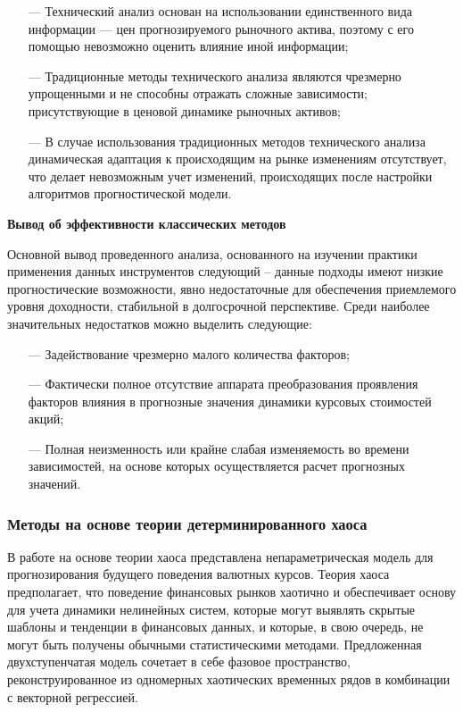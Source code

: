 \begin{itemize}[leftmargin=1.6\parindent]
    \item[---] Технический анализ основан на использовании единственного
вида информации –-- цен прогнозируемого рыночного актива, поэтому с
его помощью невозможно оценить влияние иной информации;
	\item[---] Традиционные методы технического анализа являются чрезмерно упрощенными и не способны отражать сложные зависимости;
присутствующие в ценовой динамике рыночных активов;
    \item[---] В случае использования традиционных методов технического
анализа динамическая адаптация к происходящим на рынке изменениям отсутствует, что делает невозможным учет изменений, происходящих после настройки алгоритмов прогностической модели.
\end{itemize}

\textbf{Вывод об эффективности классических методов}

\par Основной вывод проведенного анализа, основанного на изучении
практики применения данных инструментов следующий – данные подходы имеют низкие прогностические возможности, явно недостаточные для обеспечения приемлемого уровня доходности, стабильной в
долгосрочной перспективе. Среди наиболее значительных недостатков можно выделить следующие:

\begin{itemize}[leftmargin=1.6\parindent]
	\item[---] Задействование чрезмерно малого количества факторов;
    \item[---] Фактически полное отсутствие аппарата преобразования проявления факторов
влияния в прогнозные значения динамики курсовых стоимостей акций;
    \item[---] Полная неизменность или крайне слабая изменяемость во времени зависимостей,
на основе которых осуществляется расчет прогнозных значений. 
\end{itemize}

\newpage

\subsubsection{Методы на основе теории детерминированного хаоса}

\par В работе \cite{chaos-based} на основе теории хаоса представлена непараметрическая модель для
прогнозирования будущего поведения валютных курсов. Теория хаоса предполагает, что
поведение финансовых рынков хаотично и обеспечивает основу для учета динамики нелинейных систем, которые могут выявлять скрытые шаблоны и тенденции в финансовых
данных, и которые, в свою очередь, не могут быть получены обычными статистическими
методами. Предложенная двухступенчатая модель сочетает в себе фазовое пространство,
реконструированное из одномерных хаотических временных рядов в комбинации с векторной регрессией.

